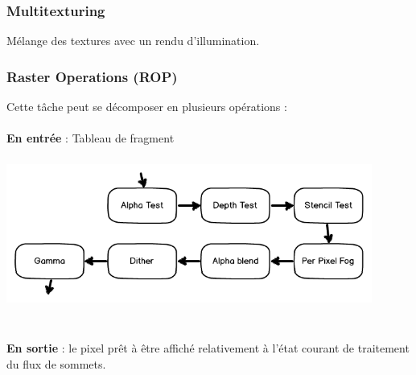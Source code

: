 \subsubsection{Multitexturing}
Mélange des textures avec un rendu d’illumination.

\subsubsection{Raster Operations (ROP)}
Cette tâche peut se décomposer en plusieurs opérations :
\\\\
\textbf{En entrée} : Tableau de fragment
\begin{center}
\includegraphics[width=12cm,height=50mm]{pipeline/images/rasterOp.png}
\end{center}
\textbf{\\En sortie} : le pixel prêt à être affiché relativement à l'état courant de traitement du flux de sommets.
\\

